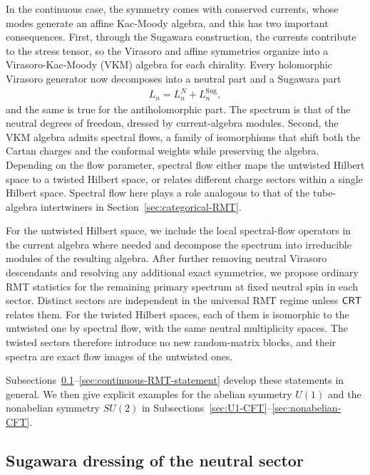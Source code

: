 \documentclass[11pt]{article}
\numberwithin{equation}{section}
\begin{document}
In the continuous case, the symmetry comes with conserved currents, whose modes generate an affine Kac-Moody algebra, and this has two important consequences. First, through the Sugawara construction, the currents contribute to the stress tensor, so the Virasoro and affine symmetries organize into a Virasoro-Kac-Moody (VKM) algebra for each chirality. Every holomorphic Virasoro generator now decomposes into a neutral part and a Sugawara part
\begin{align}
    L_n=L_n^N+L_n^{\mathrm{Sug}},
\end{align}
and the same is true for the antiholomorphic part. The spectrum is that of the neutral degrees of freedom, dressed by current-algebra modules. Second, the VKM algebra admits spectral flows, a family of isomorphisms that shift both the Cartan charges and the conformal weights while preserving the algebra. Depending on the flow parameter, spectral flow either maps the untwisted Hilbert space to a twisted Hilbert space, or relates different charge sectors within a single Hilbert space. Spectral flow here plays a role analogous to that of the tube-algebra intertwiners in Section~\ref{sec:categorical-RMT}.

 For the untwisted Hilbert space, we include the local spectral-flow operators in the current algebra where needed and decompose the spectrum into irreducible modules of the resulting algebra. After further removing neutral Virasoro descendants and resolving any additional exact symmetries, we propose ordinary RMT statistics for the remaining primary spectrum at fixed neutral spin in each sector. Distinct sectors are independent in the universal RMT regime unless $\mathsf{CRT}$ relates them. For the twisted Hilbert spaces, each of them is isomorphic to the untwisted one by spectral flow, with the same neutral multiplicity spaces. The twisted sectors therefore introduce no new random-matrix blocks, and their spectra are exact flow images of the untwisted ones.

Subsections~\ref{sec:sugawara-general}--\ref{sec:continuous-RMT-statement} develop these statements in general. We then give explicit examples for the abelian symmetry $U(1)$ and the nonabelian symmetry $SU(2)$ in Subsections~\ref{sec:U1-CFT}--\ref{sec:nonabelian-CFT}.

\subsection{Sugawara dressing of the neutral sector}
\label{sec:sugawara-general}
\end{document}
